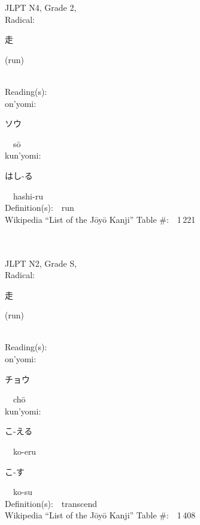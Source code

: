 \begin{multicols}{2}
{JLPT N4, Grade 2, \\Radical:\ \ {\begin{CJK}{UTF8}{min} 走 \end{CJK}} (run) } \\
Reading(s):\ \ \\
{\hspace*{1em}}on'yomi:\ \ \\
{\hspace*{2em}}{\begin{CJK}{UTF8}{min} ソウ \end{CJK}}\ \ s\=o\ \ \\
{\hspace*{1em}}kun'yomi:\ \ \\
{\hspace*{2em}}{\begin{CJK}{UTF8}{min} はし-る \end{CJK}}\ \ hashi-ru\ \ \\
Definition(s):\ \ run \\
Wikipedia ``List of the J\=oy\=o Kanji'' Table \#:\ \ 1\,221 \\
\ \ \\
{\fontsize{34pt}{40pt}  }\ \ \\  %
{JLPT N2, Grade S, \\Radical:\ \ {\begin{CJK}{UTF8}{min} 走 \end{CJK}} (run) } \\
Reading(s):\ \ \\
{\hspace*{1em}}on'yomi:\ \ \\
{\hspace*{2em}}{\begin{CJK}{UTF8}{min} チョウ \end{CJK}}\ \ ch\=o\ \ \\
{\hspace*{1em}}kun'yomi:\ \ \\
{\hspace*{2em}}{\begin{CJK}{UTF8}{min} こ-える \end{CJK}}\ \ ko-eru\ \ \\
{\hspace*{2em}}{\begin{CJK}{UTF8}{min} こ-す \end{CJK}}\ \ ko-su\ \ \\
Definition(s):\ \ transcend \\
Wikipedia ``List of the J\=oy\=o Kanji'' Table \#:\ \ 1\,408 \\
\ \ \\
\end{multicols}


